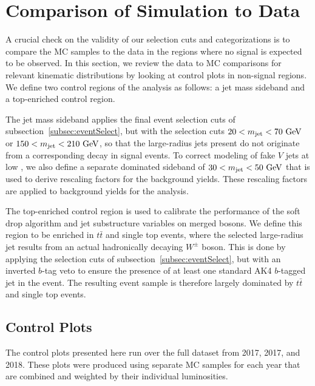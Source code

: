 
\section{Comparison of Simulation to Data}
\label{sec:comp}

A crucial check on the validity of our selection cuts and categorizations is to compare the MC samples to the data in the regions where no signal is expected to be observed.
In this section, we review the data to MC comparisons for relevant kinematic distributions by looking at control plots in non-signal regions.
We define two control regions of the analysis as follows: a jet mass sideband and a top-enriched control region.

The jet mass sideband applies the final event selection cuts of subsection~\ref{subsec:eventSelect}, but with the \MJ selection cuts $20<\MJ<70\unit{GeV}$ or $150<\MJ<210\unit{GeV}$, so that the \Vhad large-radius jets present do not originate from a corresponding \VorH decay in signal events.
To correct modeling of fake $V$ jets at low \pt, we also define a separate \Wjets dominated sideband of $30<\MJ<50\unit{GeV}$ that is used to derive rescaling factors for the \Wjets background yields.
These rescaling factors are applied to \Wjets background yields for the analysis.

The top-enriched control region is used to calibrate the performance of the soft drop algorithm and jet substructure variables on merged bosons.
We define this region to be enriched in $t\bar{t}$ and single top events, where the selected large-radius jet results from an actual hadronically decaying $W^\pm$ boson.
This is done by applying the selection cuts of subsection~\ref{subsec:eventSelect}, but with an inverted $b$-tag veto to ensure the presence of at least one standard AK4 $b$-tagged jet in the event.
The resulting event sample is therefore largely dominated by $t\bar{t}$ and single top events.

\subsection{Control Plots}

The control plots presented here run over the full dataset from 2017, 2017, and 2018.
These plots were produced using separate MC samples for each year that are combined and weighted by their individual luminosities.

